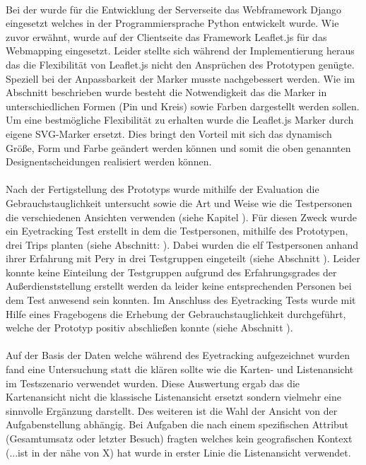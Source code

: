 \documentclass[Bachelorarbeit.tex]{subfiles}
\begin{document}
\\
Bei der  wurde für die Entwicklung der Serverseite  das Webframework Django eingesetzt welches in der Programmiersprache Python entwickelt wurde. 
Wie zuvor erwähnt, wurde auf der Clientseite das Framework Leaflet.js für das Webmapping eingesetzt.
Leider stellte sich während der Implementierung heraus das die Flexibilität von Leaflet.js nicht den Ansprüchen des Prototypen genügte.
Speziell bei der Anpassbarkeit der Marker musste nachgebessert werden. 
Wie im Abschnitt  beschrieben wurde besteht die Notwendigkeit das die Marker in unterschiedlichen Formen (Pin und Kreis) sowie Farben dargestellt werden sollen.
Um eine bestmögliche Flexibilität zu erhalten wurde die Leaflet.js Marker durch  
eigene \ac{SVG}-Marker ersetzt.
Dies bringt den Vorteil mit sich das dynamisch Größe, Form und Farbe geändert werden können und somit die oben genannten Designentscheidungen realisiert werden können.\\
\\
Nach der Fertigstellung des Prototyps wurde mithilfe der Evaluation die Gebrauchstauglichkeit untersucht sowie die Art und Weise wie die Testpersonen die verschiedenen Ansichten verwenden (siehe Kapitel ).  
Für diesen Zweck wurde ein Eyetracking Test erstellt in dem die Testpersonen, mithilfe des Prototypen, drei Trips planten (siehe Abschnitt: ). 
Dabei wurden die elf Testpersonen anhand ihrer Erfahrung mit Pery in drei Testgruppen eingeteilt (siehe Abschnitt ). 
Leider konnte keine Einteilung der Testgruppen aufgrund des Erfahrungsgrades der Außerdienststellung erstellt werden da leider keine entsprechenden Personen bei dem Test anwesend sein konnten.
Im Anschluss des Eyetracking Tests wurde mit Hilfe eines Fragebogens die Erhebung der Gebrauchstauglichkeit durchgeführt, welche der Prototyp positiv abschließen konnte (siehe Abschnitt ). \\
\\
Auf der Basis der Daten welche während des Eyetracking aufgezeichnet wurden fand eine Untersuchung statt die klären sollte wie die Karten- und Listenansicht im Testszenario verwendet wurden.
Diese Auswertung ergab das die Kartenansicht nicht die klassische Listenansicht ersetzt sondern vielmehr eine sinnvolle Ergänzung darstellt.
Des weiteren ist die Wahl der Ansicht von der Aufgabenstellung abhängig.
Bei Aufgaben die nach einem spezifischen Attribut (Gesamtumsatz oder letzter Besuch) fragten welches kein geografischen Kontext (...ist in der nähe von X) hat wurde in erster Linie die Listenansicht verwendet.
\end{document}
